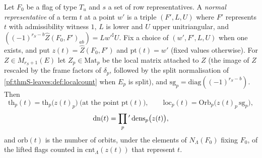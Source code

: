 \begin{definition}\label{pf:thmS-leaves:def:localterm}
Let $F_0$ be a flag of type $T_u$ and $s$ a set of row representatives. A \emph{normal representative} of a term $t$ at a
point $w'$ is a triple $(F',L,U)$ where $F'$ represents $t$ with admissibility witness $1$, $L$ is lower and $U$ upper
unitriangular, and $((-1)^{r_S-b}\widehat Z(F_0,F')_{ab})=Lw'^\sharp U$. Fix a choice of $(w',F',L,U)$ when one exists, and put
$z(t)=\widehat Z(F_0,F')$ and $\mathrm{pt}(t)=w'$ (fixed values otherwise). For $Z\in M_{r_S+1}(E)$ let $Z_p\in\mathrm{Mat}_p$ be
the local matrix attached to $Z$ (the image of $Z$ rescaled by the frame factors of $\delta_p$, followed by the split
normalisation of \cref{pf:thmS-leaves:def:localcount} when $E_p$ is split), and $\mathrm{sg}_p=\mathrm{diag}((-1)^{r_S-b})$. Then
\[
\mathrm{th}_p(t)=\mathrm{th}_p\bigl(z(t)_p\bigr)\ \text{(at the point $\mathrm{pt}(t)$)},\qquad
\mathrm{loc}_p(t)=\mathrm{Orb}_p\bigl(z(t)_p\,\mathrm{sg}_p\bigr),
\]
\[
\mathrm{dn}(t)=\prod_p{}'\,\mathrm{dens}_p\bigl(z(t)\bigr),
\]
and $\mathrm{orb}(t)$ is the number of orbits, under the elements of $N_\Lambda(F_0)$ fixing $F_0$, of the lifted flags counted
in $\mathrm{cnt}_\Lambda(z(t))$ that represent $t$.
\end{definition}

